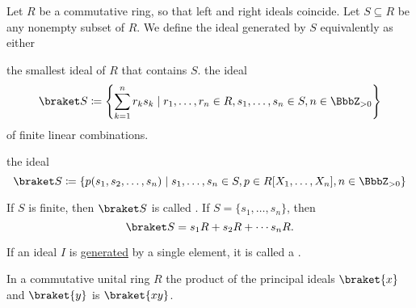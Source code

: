 \begin{definition}\label{def:generated_ring_ideal}
  Let \( R \) be a commutative ring, so that left and right ideals coincide. Let \( S \subseteq R \) be any nonempty subset of \( R \). We define the ideal generated by \( S \) equivalently as either
  \begin{thmenum}
     the smallest ideal of \( R \) that contains \( S \).
     the ideal
    \begin{equation*}
      \braket S \coloneqq \left\{ \sum_{k=1}^n r_k s_k \mid r_1, \ldots, r_n \in R, s_1, \ldots, s_n \in S, n \in \BbbZ_{>0} \right\}
    \end{equation*}
    of finite linear combinations.

     the ideal
    \begin{equation*}
      \braket S \coloneqq \left\{ p(s_1, s_2, \ldots, s_n) \mid s_1, \ldots, s_n \in S, p \in R[X_1, \ldots, X_n], n \in \BbbZ_{>0} \right\}
    \end{equation*}
  \end{thmenum}

  If \( S \) is finite, then \( \braket S \) is called . If \( S = \{ s_1, \ldots, s_n \} \), then
  \begin{equation*}
    \braket S = s_1 R + s_2 R + \cdots s_n R.
  \end{equation*}
\end{definition}

\begin{definition}\label{def:principal_ideal}
  If an ideal \( I \) is \hyperref[def:generated_ring_ideal]{generated} by a single element, it is called a .
\end{definition}

\begin{proposition}\label{thm:product_of_principal_ideals}
  In a commutative unital ring \( R \) the product of the principal ideals \( \braket{x} \) and \( \braket{y} \) is \( \braket{xy} \).
\end{proposition}
